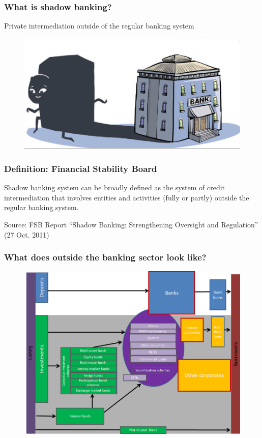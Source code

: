 \documentclass[11pt]{beamer}
\begin{document}
\begin{frame}
\frametitle{What is shadow banking?}
Private intermediation outside of the regular banking system
\begin{figure}
\includegraphics[width=\textwidth]{shadowbank1.png}
\end{figure}
\end{frame}


\begin{frame}
\frametitle{Definition: Financial Stability Board}
\begin{center}
Shadow banking system can be broadly defined as the system of credit intermediation that involves entities and activities (fully or partly) outside the regular banking system.

\end{center}
\tiny{Source: FSB Report “Shadow Banking: Strengthening Oversight and Regulation” (27 Oct. 2011) }
\end{frame}

\begin{frame}
\frametitle{What does outside the banking sector look like?}
\begin{figure}
\includegraphics[width=\textwidth]{shadowbank2.png}
\end{figure}
\end{frame}
\end{document}
